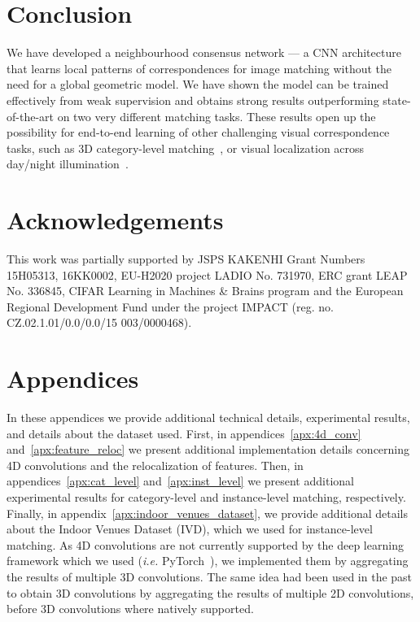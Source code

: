 \documentclass{article}
\begin{document}
\section{Conclusion}
We have developed a neighbourhood consensus network — a CNN architecture  that learns local patterns of correspondences for image matching without the need for a global geometric model. We have shown the model can be trained effectively from weak supervision and obtains strong results outperforming state-of-the-art on two very different matching tasks.  These results open up the possibility for end-to-end learning of other challenging visual correspondence tasks, such as 3D category-level matching~\cite{Kanazawa18}, or visual localization across day/night illumination~\cite{Sattler18}.  

\section*{Acknowledgements}

This work was partially supported by
JSPS KAKENHI Grant Numbers 15H05313, 16KK0002, EU-H2020 project LADIO No. 731970, ERC
grant LEAP No. 336845, CIFAR Learning in Machines
\& Brains program and the European Regional
Development Fund under the project IMPACT (reg.
no. CZ.02.1.01/0.0/0.0/15 003/0000468). 




\clearpage
\appendix
\section*{{\Large Appendices}}
In these appendices we provide additional technical details, experimental results, and details about the dataset used. First, in appendices~\ref{apx:4d_conv} and~\ref{apx:feature_reloc} we present additional implementation details concerning 4D convolutions and the relocalization of features. Then, in appendices~\ref{apx:cat_level} and~\ref{apx:inst_level} we present additional experimental results for category-level and instance-level matching, respectively. Finally, in appendix~\ref{apx:indoor_venues_dataset}, we provide additional details about the Indoor Venues Dataset (IVD), which we used for instance-level matching.
As 4D convolutions are not currently supported by the deep learning framework which we used (\emph{i.e.} PyTorch~\cite{pytorch}), we implemented them by aggregating the results of multiple 3D convolutions. The same idea had been used in the past to obtain 3D convolutions by aggregating the results of multiple 2D convolutions, before 3D convolutions where natively supported.
\end{document}
